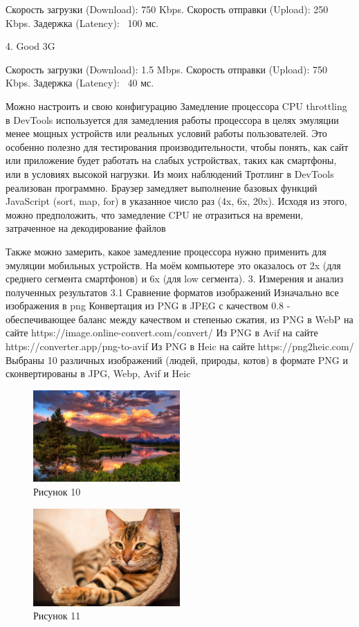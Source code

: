 \documentclass[12pt]{article}
\begin{document}
Скорость загрузки (Download): 750 Kbps.
Скорость отправки (Upload): 250 Kbps.
Задержка (Latency): ~100 мс.

4. Good 3G

Скорость загрузки (Download): 1.5 Mbps.
Скорость отправки (Upload): 750 Kbps.
Задержка (Latency): ~40 мс.

Можно настроить и свою конфигурацию
Замедление процессора
CPU throttling в DevTools используется для замедления работы процессора в целях эмуляции менее мощных устройств или реальных условий работы пользователей.
Это особенно полезно для тестирования производительности, чтобы понять, как сайт или приложение будет работать на слабых устройствах,
таких как смартфоны, или в условиях высокой нагрузки.
Из моих наблюдений
 Тротлинг в DevTools реализован программно. Браузер замедляет выполнение базовых функций JavaScript (sort, map, for) в указанное число раз (4x, 6x, 20x).
Исходя из этого, можно предположить, что замедление CPU не отразиться на времени, затраченное на декодирование файлов

Также можно замерить, какое замедление процессора нужно применить для эмуляции мобильных устройств. На моём компьютере это оказалось от 2x (для среднего сегмента смартфонов) и 6x (для low сегмента).
3. Измерения и анализ полученных результатов
3.1 Сравнение форматов изображений
Изначально все изображения в png
Конвертация из PNG в JPEG с качеством 0.8 - обеспечивающее баланс между качеством и степенью сжатия, из PNG в WebP на сайте https://image.online-convert.com/convert/
Из PNG в Avif на сайте https://converter.app/png-to-avif
Из PNG в Heic на сайте https://png2heic.com/
Выбраны 10 различных изображений (людей, природы, котов) в формате PNG и сконвертированы в JPG, Webp, Avif и Heic
\begin{figure}[h!]
\centering
\includegraphics[width=0.5\textwidth]{../images/image_comp/image1.png}
\caption{Рисунок 10}
\end{figure}

\begin{figure}[h!]
\centering
\includegraphics[width=0.5\textwidth]{../images/image_comp/image4.png}
\caption{Рисунок 11}
\end{figure}
\end{document}

